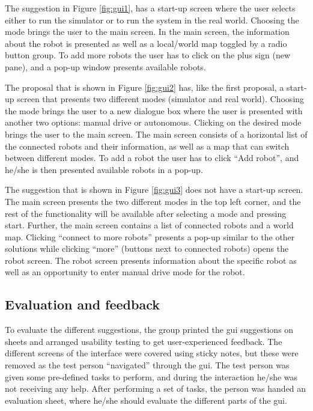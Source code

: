 The suggestion in Figure \ref{fig:gui1}, has a start-up screen where the user selects either to run the simulator or to run the system in the real world. Choosing the mode brings the user to the main screen. In the main screen, the information about the robot is presented as well as a local/world map toggled by a radio button group. To add more robots the user has to click on the plus sign (new pane), and a pop-up window presents available robots.

The proposal that is shown in Figure \ref{fig:gui2} has, like the first proposal, a start-up screen that presents two different modes (simulator and real world). Choosing the mode brings the user to a new dialogue box where the user is presented with another two options: manual drive or autonomous. Clicking on the desired mode brings the user to the main screen. The main screen consists of a horizontal list of the connected robots and their information, as well as a map that can switch between different modes. To add a robot the user has to click ``Add robot'', and he/she is then presented available robots in a pop-up.

The suggestion that is shown in Figure \ref{fig:gui3} does not have a start-up screen. The main screen presents the two different modes in the top left corner, and the rest of the functionality will be available after selecting a mode and pressing start. Further, the main screen contains a list of connected robots and a world map. Clicking ``connect to more robots'' presents a pop-up similar to the other solutions while clicking ``more'' (buttons next to connected robots) opens the robot screen. The robot screen presents information about the specific robot as well as an opportunity to enter manual drive mode for the robot.

\subsection{Evaluation and feedback}
\label{sec:evalandfeedback}
To evaluate the different suggestions, the group printed the \acrshort{gui} suggestions on sheets and arranged usability testing to get user-experienced feedback. The different screens of the interface were covered using sticky notes, but these were removed as the test person ``navigated'' through the \acrshort{gui}. The test person was given some pre-defined tasks to perform, and during the interaction he/she was not receiving any help. After performing a set of tasks, the person was handed an evaluation sheet, where he/she should evaluate the different parts of the \acrshort{gui}.

